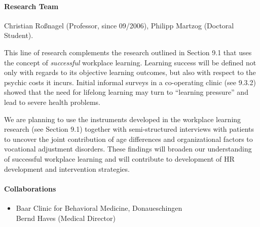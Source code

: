 

\paragraph{Research Team}
Christian Ro\ss nagel (Professor, since 09/2006), Philipp Martzog (Doctoral Student).

 This line of research complements the research outlined in Section 9.1 that uses the concept of \textit{successful} workplace learning. Learning success will be defined not only with regards to its objective learning outcomes, but also with respect to the psychic costs it incurs. Initial informal surveys in a co-operating clinic (see 9.3.2) showed that the need for lifelong learning may turn to ``learning pressure'' and lead to severe health problems.

 We are planning to use the instruments developed in the workplace learning research (see Section 9.1) together with semi-structured interviews with patients to uncover the joint contribution of age differences and organizational factors to vocational adjustment disorders. These findings will broaden our understanding of successful workplace learning and will contribute to development of HR development and intervention strategies.

\paragraph{Collaborations}
\begin{itemize}
\item Baar Clinic for Behavioral Medicine, Donaueschingen \\ Bernd Haves (Medical Director)
\end{itemize}
